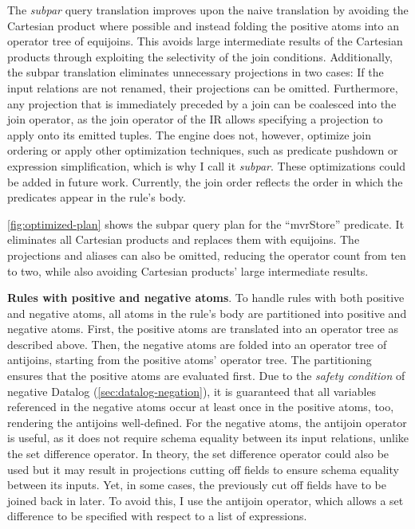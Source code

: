 The \emph{subpar} query translation improves upon the naive translation
by avoiding the Cartesian product where possible and instead folding the positive
atoms into an operator tree of equijoins.
This avoids large intermediate results of the Cartesian products through
exploiting the selectivity of the join conditions.
Additionally, the subpar translation eliminates unnecessary projections
in two cases:
If the input relations are not renamed, their projections can be omitted.
Furthermore, any projection that is immediately preceded by a join can be
coalesced into the join operator, as the join operator of the \ac{IR}
allows specifying a projection to apply onto its emitted tuples.
The engine does not, however, optimize join ordering or apply other
optimization techniques, such as predicate pushdown or expression simplification,
which is why I call it \emph{subpar}.
These optimizations could be added in future work.
Currently, the join order reflects the order in which the predicates appear
in the rule's body.

\ref{fig:optimized-plan} shows the subpar query plan for the ``mvrStore''
predicate.
It eliminates all Cartesian products and replaces them with equijoins.
The projections and aliases can also be omitted, reducing the operator count
from ten to two,
while also avoiding Cartesian products' large intermediate results.



\textbf{Rules with positive and negative atoms}.
To handle rules with both positive and negative atoms,
all atoms in the rule's body are partitioned into positive and negative atoms.
First, the positive atoms are translated into an operator tree as described above.
Then, the negative atoms are folded into an operator tree of antijoins,
starting from the positive atoms' operator tree.
The partitioning ensures that the positive atoms are evaluated first.
Due to the \emph{safety condition} of negative Datalog (\ref{sec:datalog-negation}),
it is guaranteed that all variables referenced in the negative atoms occur
at least once in the positive atoms, too, rendering the antijoins well-defined.
For the negative atoms, the antijoin operator is useful, as it does not
require schema equality between its input relations, unlike the set difference operator.
In theory, the set difference operator could also be used but it may result
in projections cutting off fields to ensure schema equality between its inputs.
Yet, in some cases, the previously cut off fields have to be joined back in later.
To avoid this, I use the antijoin operator, which allows a set difference
to be specified with respect to a list of expressions.

